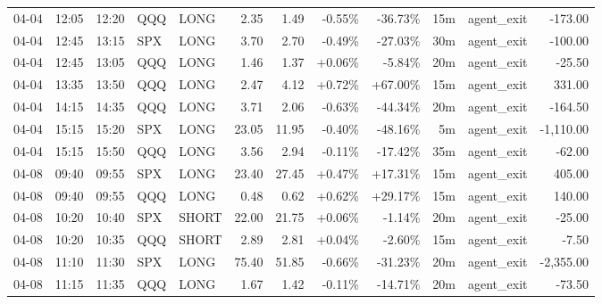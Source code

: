 \documentclass[11pt,a4paper]{article}
\begin{document}
\begin{center}
\begin{longtable}{>{\color{txtmain}}l l l l l r r r r r >{\color{txtmain}}l r}
04-04 & 12:05 & 12:20 & QQQ & LONG & 2.35 & 1.49 & \textcolor{lossred}{-0.55\%} & \textcolor{lossred}{-36.73\%} & 15m & agent\_exit & \textcolor{lossred}{-173.00} \\
04-04 & 12:45 & 13:15 & SPX & LONG & 3.70 & 2.70 & \textcolor{lossred}{-0.49\%} & \textcolor{lossred}{-27.03\%} & 30m & agent\_exit & \textcolor{lossred}{-100.00} \\
04-04 & 12:45 & 13:05 & QQQ & LONG & 1.46 & 1.37 & \textcolor{wingreen}{+0.06\%} & \textcolor{lossred}{-5.84\%} & 20m & agent\_exit & \textcolor{lossred}{-25.50} \\
04-04 & 13:35 & 13:50 & QQQ & LONG & 2.47 & 4.12 & \textcolor{wingreen}{+0.72\%} & \textcolor{wingreen}{+67.00\%} & 15m & agent\_exit & \textcolor{wingreen}{331.00} \\
04-04 & 14:15 & 14:35 & QQQ & LONG & 3.71 & 2.06 & \textcolor{lossred}{-0.63\%} & \textcolor{lossred}{-44.34\%} & 20m & agent\_exit & \textcolor{lossred}{-164.50} \\
04-04 & 15:15 & 15:20 & SPX & LONG & 23.05 & 11.95 & \textcolor{lossred}{-0.40\%} & \textcolor{lossred}{-48.16\%} & 5m & agent\_exit & \textcolor{lossred}{-1,110.00} \\
04-04 & 15:15 & 15:50 & QQQ & LONG & 3.56 & 2.94 & \textcolor{lossred}{-0.11\%} & \textcolor{lossred}{-17.42\%} & 35m & agent\_exit & \textcolor{lossred}{-62.00} \\
04-08 & 09:40 & 09:55 & SPX & LONG & 23.40 & 27.45 & \textcolor{wingreen}{+0.47\%} & \textcolor{wingreen}{+17.31\%} & 15m & agent\_exit & \textcolor{wingreen}{405.00} \\
04-08 & 09:40 & 09:55 & QQQ & LONG & 0.48 & 0.62 & \textcolor{wingreen}{+0.62\%} & \textcolor{wingreen}{+29.17\%} & 15m & agent\_exit & \textcolor{wingreen}{140.00} \\
04-08 & 10:20 & 10:40 & SPX & SHORT & 22.00 & 21.75 & \textcolor{wingreen}{+0.06\%} & \textcolor{lossred}{-1.14\%} & 20m & agent\_exit & \textcolor{lossred}{-25.00} \\
04-08 & 10:20 & 10:35 & QQQ & SHORT & 2.89 & 2.81 & \textcolor{wingreen}{+0.04\%} & \textcolor{lossred}{-2.60\%} & 15m & agent\_exit & \textcolor{lossred}{-7.50} \\
04-08 & 11:10 & 11:30 & SPX & LONG & 75.40 & 51.85 & \textcolor{lossred}{-0.66\%} & \textcolor{lossred}{-31.23\%} & 20m & agent\_exit & \textcolor{lossred}{-2,355.00} \\
04-08 & 11:15 & 11:35 & QQQ & LONG & 1.67 & 1.42 & \textcolor{lossred}{-0.11\%} & \textcolor{lossred}{-14.71\%} & 20m & agent\_exit & \textcolor{lossred}{-73.50} \\

\end{longtable}
\end{center}
\end{document}
